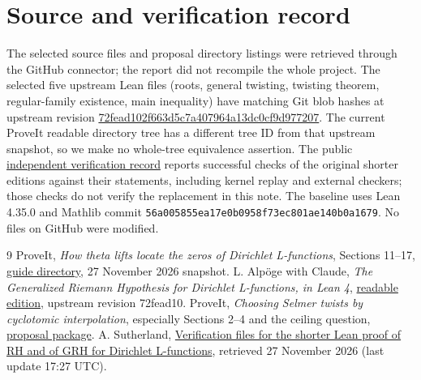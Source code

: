 \documentclass[11pt]{article}
\newcommand{\propbase}{https://github.com/VladimirReshetnikov/ProveIt/tree/ef7d441dcb37ea944b7ac15731bb766f2e1354ea/Analysis/GeneralizedRiemannHypothesis/docs/proposals}
\begin{document}
\section*{Source and verification record}
The selected source files and proposal directory listings were retrieved through the GitHub connector; the report did not recompile the whole project. The selected five upstream Lean files (roots, general twisting, twisting theorem, regular-family existence, main inequality) have matching Git blob hashes at upstream revision \href{https://github.com/lsernau/grh-lean/tree/72fead102f663d5c7a407964a13dc0cf9d977207/grh}{72fead102f663d5c7a407964a13dc0cf9d977207}. The current ProveIt readable directory tree has a different tree ID from that upstream snapshot, so we make no whole-tree equivalence assertion. The public \href{https://math.mit.edu/~drew/shortgrh/}{independent verification record} reports successful checks of the original shorter editions against their statements, including kernel replay and external checkers; those checks do not verify the replacement in this note. The baseline uses Lean 4.35.0 and Mathlib commit \texttt{56a005855ea17e0b0958f73ec801ae140b0a1679}. No files on GitHub were modified.

\begin{thebibliography}{9}\small
{} ProveIt, \emph{How theta lifts locate the zeros of Dirichlet L-functions}, Sections 11--17, \href{https://github.com/VladimirReshetnikov/ProveIt/tree/ef7d441dcb37ea944b7ac15731bb766f2e1354ea/Analysis/GeneralizedRiemannHypothesis/docs/guide}{guide directory}, 27 November 2026 snapshot.
 L. Alp\"oge with Claude, \emph{The Generalized Riemann Hypothesis for Dirichlet L-functions, in Lean 4}, \href{https://github.com/lsernau/grh-lean/tree/72fead102f663d5c7a407964a13dc0cf9d977207/grh}{readable edition}, upstream revision 72fead10.
 ProveIt, \emph{Choosing Selmer twists by cyclotomic interpolation}, especially Sections 2--4 and the ceiling question, \href{\propbase/cyclotomic-interpolation-and-theta-lifts}{proposal package}.
 A. Sutherland, \href{https://math.mit.edu/~drew/shortgrh/}{Verification files for the shorter Lean proof of RH and of GRH for Dirichlet L-functions}, retrieved 27 November 2026 (last update 17:27 UTC).
\end{thebibliography}
\end{document}
